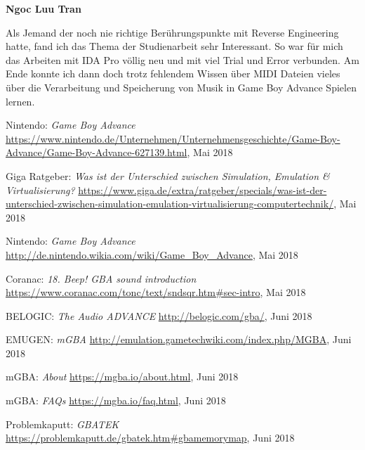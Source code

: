 \documentclass[11pt,a4paper]{scrartcl}
\newcommand{\paratitle}[1] {
    \vspace{5mm}
    \large \textbf{#1} \normalsize
    \vspace{2mm}\newline
}
\begin{document}
\vspace{-2mm}
\paratitle{Ngoc Luu Tran}
Als Jemand der noch nie richtige Ber\"uhrungspunkte mit Reverse Engineering hatte, fand ich das Thema der Studienarbeit sehr Interessant. So war f\"ur mich das Arbeiten mit IDA Pro v\"ollig neu und mit viel Trial und Error verbunden. Am Ende konnte ich dann doch trotz fehlendem Wissen \"uber MIDI Dateien vieles \"uber die Verarbeitung und Speicherung von Musik in Game Boy Advance Spielen lernen.


\newpage
{}

\begin{thebibliography}{tiefe}
    Nintendo: \textit{Game Boy Advance}\newline
    \url{https://www.nintendo.de/Unternehmen/Unternehmensgeschichte/Game-Boy-Advance/Game-Boy-Advance-627139.html}, Mai 2018
    
    Giga Ratgeber: \textit{Was ist der Unterschied zwischen Simulation, Emulation \& Virtualisierung?}\newline
    \url{https://www.giga.de/extra/ratgeber/specials/was-ist-der-unterschied-zwischen-simulation-emulation-virtualisierung-computertechnik/}, Mai 2018
    
    Nintendo: \textit{Game Boy Advance}\newline
    \url{http://de.nintendo.wikia.com/wiki/Game_Boy_Advance}, Mai 2018
    
    Coranac: \textit{18. Beep! GBA sound introduction}\newline
    \url{https://www.coranac.com/tonc/text/sndsqr.htm#sec-intro}, Mai 2018
    
    BELOGIC: \textit{The Audio ADVANCE}\newline
    \url{http://belogic.com/gba/}, Juni 2018

    EMUGEN: \textit{mGBA}\newline
    \url{http://emulation.gametechwiki.com/index.php/MGBA}, Juni 2018

    mGBA: \textit{About}\newline
    \url{https://mgba.io/about.html}, Juni 2018

    mGBA: \textit{FAQs}\newline
    \url{https://mgba.io/faq.html}, Juni 2018

    Problemkaputt: \textit{GBATEK}\newline
    \url{https://problemkaputt.de/gbatek.htm#gbamemorymap}, Juni 2018
\end{thebibliography}
\end{document}
